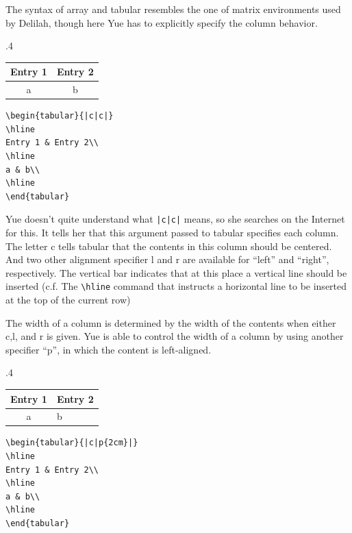 The syntax of array and tabular resembles the one of matrix environments used by Delilah, though here Yue has to explicitly specify the column behavior.
\begin{miniexammar}{.4\textandmarginlen}{
\begin{tabular}{|c|c|}
\hline 
Entry 1 & Entry 2\\
\hline
a & b\\
\hline
\end{tabular}
}
\begin{lstlisting}
\begin{tabular}{|c|c|}
\hline 
Entry 1 & Entry 2\\
\hline
a & b\\
\hline
\end{tabular}
\end{lstlisting}
\end{miniexammar}

Yue doesn't quite understand what \verb=|c|c|= means, so she searches on the Internet for this. It tells her that this argument passed to tabular specifies each column. The letter c tells tabular that the contents in this column should be centered. And two other alignment specifier l and r are available for ``left'' and ``right'', respectively. The vertical bar indicates that at this place a vertical line should be inserted (c.f. The \verb=\hline= command that instructs a horizontal line to be inserted at the top of the current row)

The width of a column is determined by the width of the contents when either c,l, and r is given. Yue is able to control the width of a column by using another specifier ``p'', in which the content is left-aligned.
\begin{miniexammar}{.4\textandmarginlen}{
\begin{tabular}{|c|p{2cm}|}
\hline 
Entry 1 & Entry 2\\
\hline
a & b\\
\hline
\end{tabular}
}
\begin{lstlisting}
\begin{tabular}{|c|p{2cm}|}
\hline 
Entry 1 & Entry 2\\
\hline
a & b\\
\hline
\end{tabular}
\end{lstlisting}
\end{miniexammar}

